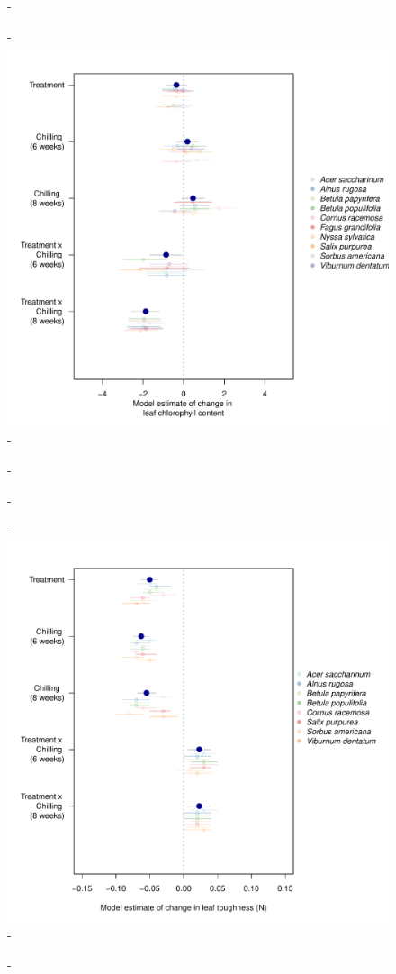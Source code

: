 \documentclass{article}\usepackage[]{graphicx}\usepackage[]{color}
\begin{document}
  {\begin{figure} [H]
  -\begin{center}
  -\includegraphics[width=16cm]{..//analyses/figures/chlavg.pdf} %
  -\end{center}
  -\end{figure}}
  
  {\begin{figure} [H]
  -\begin{center}
  -\includegraphics[width=16cm]{..//analyses/figures/toughness_brms.pdf} %
  -\end{center}
  -\end{figure}}
  
\end{document}
